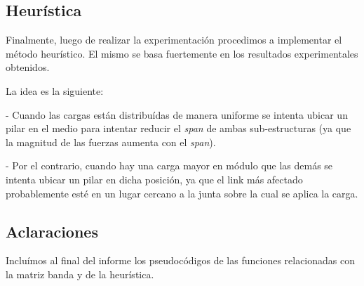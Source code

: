 



\subsection{Heurística}

Finalmente, luego de realizar la experimentación procedimos a implementar el método heurístico. El mismo se basa fuertemente
en los resultados experimentales obtenidos.

La idea es la siguiente:

- Cuando las cargas están distribuídas de manera uniforme se intenta ubicar un pilar en el medio para intentar reducir el
\emph{span} de ambas sub-estructuras (ya que la magnitud de las fuerzas aumenta con el \emph{span}).

- Por el contrario, cuando hay una carga mayor en módulo que las demás se intenta ubicar un pilar en dicha posición,
ya que el link más afectado probablemente esté en un lugar cercano a la junta sobre la cual se aplica la carga.

\subsection{Aclaraciones}

Incluímos al final del informe los pseudocódigos de las funciones relacionadas con la matriz banda y de la heurística.
